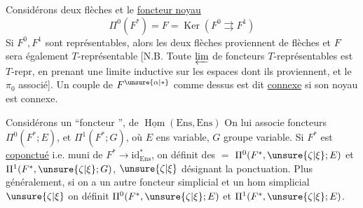 Considérons deux  flèches
et le \uline{foncteur noyau}
\[
\Pi^0(F^*)=F=\operatorname{Ker}(F^0\rightrightarrows F^1)
\]
Si $F^0,F^1$ sont représentables,
alors les deux flèches proviennent de flèches
et $F$ sera également $T$-représentable
[N.B. Toute $\varprojlim$ de foncteurs $T$-représentables est $T$-repr,
en prenant une limite inductive sur les espaces dont ils proviennent,
\deleted{$\unsure{\xi}$} et le $\pi_0$ associé].
Un couple de $F^{\unsure{\alpha|*}}$ comme dessus est dit
\uline{connexe} si son noyau est connexe.

Considérons un ``foncteur '',
de $\underline{\operatorname{Hom}}(\mathrm{Ens},\mathrm{Ens})$
On lui associe foncteurs $\Pi^0(F^*;E)$,
 et $\Pi^1(F^*;G)$,
où $E$ ens variable, $G$ groupe variable.
Si $F^*$ est \uline{coponctué} i.e. muni de
$F^*\to\mathrm{id}_{\mathrm{Ens}}^*$, on définit des $=$
$\Pi^0(F^*,\unsure{\zeta|\xi};E)$ et
$\Pi^1(F^*,\unsure{\zeta|\xi};G)$, $\unsure{\zeta|\xi}$
désignant la ponctuation. Plus généralement, si on a un autre foncteur
simplicial
 et un hom simplicial $\unsure{\zeta|\xi}$
on définit $\Pi^0(F^*,\unsure{\zeta|\xi};E)$ et
$\Pi^1(F^*,\unsure{\zeta|\xi};E)$.

